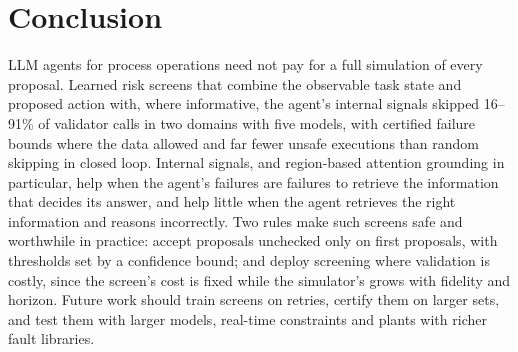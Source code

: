 \section{Conclusion}\label{sec:conclusion}

LLM agents for process operations need not pay for a full simulation of every proposal. Learned risk screens that
combine the observable task state and proposed action with, where informative, the agent's internal signals skipped
16--91\% of validator calls in two domains with five models, with certified failure bounds where the data allowed and
far fewer unsafe executions than random skipping in closed loop. Internal signals, and region-based attention grounding
in particular, help when the agent's failures are failures to retrieve the information that decides its answer, and
help little when the agent retrieves the right information and reasons incorrectly. Two rules make such screens safe
and worthwhile in practice: accept proposals unchecked only on first proposals, with thresholds set by a confidence
bound; and deploy screening where validation is costly, since the screen's cost is fixed while the simulator's grows
with fidelity and horizon. Future work should train screens on retries, certify them on larger sets, and test them
with larger models, real-time constraints and plants with richer fault libraries.
